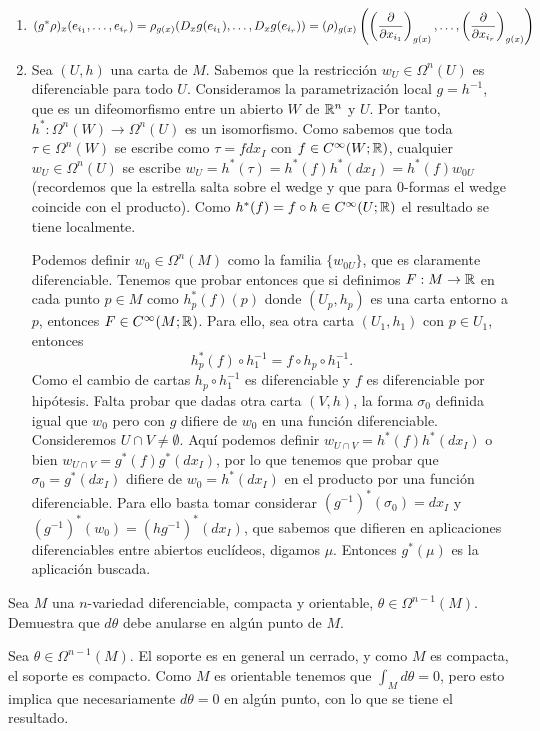 \documentclass[twoside]{article}
\begin{document}
\begin{solucion}\
\begin{enumerate}
\item 
\[
(g^*\rho)_x(e_{i_1},\dots, e_{i_r})=\rho_{g(x)}(D_xg(e_{i_1}),\dots, D_xg(e_{i_r}))=(\rho)_{g(x)}\left(\left(\frac{\partial }{\partial x_{i_1}}\right)_{g(x)},\dots, \left(\frac{\partial }{\partial x_{i_r}}\right)_{g(x)}\right)
\]
\item Sea $(U,h)$ una carta de $M$. Sabemos que la restricción $w_U\in\Omega^n(U)$ es diferenciable para todo $U$. Consideramos la parametrización local $g=h^{-1}$, que es un difeomorfismo entre un abierto $W$ de $\mathbb{R}^n$ y $U$. Por tanto, $h^*:\Omega^n(W)\to\Omega^n(U)$ es un isomorfismo. Como sabemos que toda $\tau\in\Omega^n(W)$ se escribe como $\tau=f dx_I$ con $f\in C^{\infty}(W;\mathbb{R})$, cualquier $w_U\in\Omega^n(U)$ se escribe $w_U=h^*(\tau)=h^*(f)h^*(dx_I)=h^*(f)w_{0U}$ (recordemos que la estrella salta sobre el wedge y que para 0-formas el wedge coincide con el producto). Como $h^*(f)=f\circ h\in C^{\infty}(U;\mathbb{R})$ el resultado se tiene localmente. 

Podemos definir $w_0\in\Omega^n(M)$ como la familia $\{w_{0U}\}$, que es claramente diferenciable. Tenemos que probar entonces que si definimos $F:M\to \mathbb{R}$ en cada punto $p\in M$ como $h_p^*(f)(p)$ donde $(U_p,h_p)$ es una carta entorno a $p$, entonces $F\in C^{\infty}(M;\mathbb{R})$. Para ello, sea otra carta $(U_1,h_1)$ con $p\in U_1$, entonces
\[
h_p^*(f)\circ h_1^{-1}=f\circ h_p\circ h_1^{-1}.
\]
Como el cambio de cartas $h_p\circ h^{-1}_1$ es diferenciable y $f$ es diferenciable por hipótesis. Falta probar que dadas otra carta $(V,h)$, la forma $\sigma_0$ definida igual que $w_0$ pero con $g$ difiere de $w_0$ en una función diferenciable. Consideremos $U\cap V\neq\emptyset$. Aquí podemos definir $w_{U\cap V}=h^*(f)h^*(dx_I)$ o bien $w_{U\cap V}=g^*(f)g^*(dx_I)$, por lo que tenemos que probar que $\sigma_0=g^*(dx_I)$ difiere de $w_0=h^*(dx_I)$ en el producto por una función diferenciable. Para ello basta tomar considerar $(g^{-1})^*(\sigma_0)=dx_I$ y $(g^{-1})^*(w_0)=(hg^{-1})^*(dx_I)$, que sabemos que difieren en aplicaciones diferenciables entre abiertos euclídeos, digamos $\mu$. Entonces $g^*(\mu)$ es la aplicación buscada.
\end{enumerate}

\end{solucion}
\newpage

\begin{ejercicio}{4}
Sea $M$ una $n$-variedad diferenciable, compacta y orientable, $\theta\in \Omega^{n-1}(M)$. Demuestra que $d\theta$ debe anularse en algún punto de $M$.
\end{ejercicio}
\begin{solucion}
Sea $\theta\in\Omega^{n-1}(M)$. El soporte es en general un cerrado, y como $M$ es compacta, el soporte es compacto. Como $M$ es orientable tenemos que $\int_M d\theta=0$, pero esto implica que necesariamente $d\theta=0$ en algún punto, con lo que se tiene el resultado. 
\end{solucion}
\end{document}
